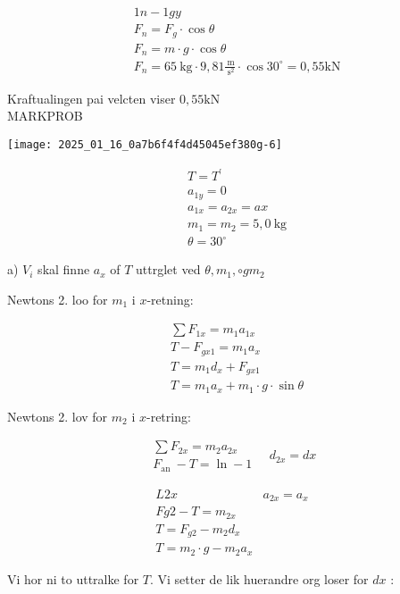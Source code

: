 \documentclass[10pt]{article}
\begin{document}
$$
\begin{aligned}
& 1 n-1 g y \\
& F_{n}=F_{g} \cdot \cos \theta \\
& F_{n}=m \cdot g \cdot \cos \theta \\
& F_{n}=65 \mathrm{~kg} \cdot 9,81 \frac{\mathrm{~m}}{\mathrm{~s}^{2}} \cdot \cos 30^{\circ}=0,55 \mathrm{kN}
\end{aligned}
$$

Kraftualingen pai velcten viser $0,55 \mathrm{kN}$\\

MARKPROB

\texttt{[image: 2025\_01\_16\_0a7b6f4f4d45045ef380g-6]}

$$
\begin{aligned}
& T=T^{\prime} \\
& a_{1 y}=0 \\
& a_{1 x}=a_{2 x}=a x \\
& m_{1}=m_{2}=5,0 \mathrm{~kg} \\
& \theta=30^{\circ}
\end{aligned}
$$

a) $V_{i}$ skal finne $a_{x}$ of $T$ uttrglet ved $\theta, m_{1}, \circ g m_{2}$

Newtons 2. loo for $m_{1}$ i $x$-retning:

$$
\begin{aligned}
& \sum F_{1 x}=m_{1} a_{1 x} \\
& T-F_{g x 1}=m_{1} a_{x} \\
& T=m_{1} d_{x}+F_{g x 1} \\
& T=m_{1} a_{x}+m_{1} \cdot g \cdot \sin \theta
\end{aligned}
$$

Newtons 2. lov for $m_{2}$ i $x$-retring:

$$
\begin{array}{ll}
\sum F_{2 x}=m_{2} a_{2 x} \\
F_{\text {an }}-T=\ln -1
\end{array} \quad d_{2 x}=d x
$$

$$
\begin{array}{ll}
L 2 x & a_{2 x}=a_{x} \\
F g 2-T=m_{2 x} & \\
T=F_{g 2}-m_{2} d_{x} & \\
T=m_{2} \cdot g-m_{2} a_{x} &
\end{array}
$$

Vi hor ni to uttralke for $T$. Vi setter de lik huerandre org loser for $d x$ :
\end{document}
